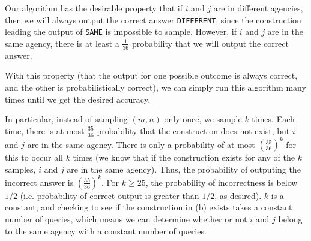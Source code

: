 \documentclass{6046}
\begin{document}
Our algorithm has the desirable property
that if $i$ and $j$ are in different agencies,
then we will always output the correct answer
{\tt DIFFERENT}, since the construction leading
the output of {\tt SAME} is impossible to sample.
However, if $i$ and $j$ are in the same agency,
there is at least a $\frac{1}{36}$ probability
that we will output the correct answer.

With this property (that the output for
one possible outcome is always correct, and the
other is probabilistically correct), we
can simply run this algorithm many times until
we get the desired accuracy.

In particular, instead of sampling
$(m, n)$ only once, we sample $k$ times.
Each time, there is at most $\frac{35}{36}$
probability that the construction does not
exist, but $i$ and $j$ are in the same agency.
There is only a probability of at most
$(\frac{35}{36})^k$ for this to occur all
$k$ times (we know that if the construction
exists for any of the $k$ samples, $i$ and $j$
are in the same agency). Thus, the probability
of outputing the incorrect answer is
$(\frac{35}{36})^k$. For $k \ge 25$,
the probability of incorrectness is below
$1/2$ (i.e. probability of correct output
is greater than $1/2$, as desired). $k$ is
a constant, and checking to see if the
construction in (b) exists takes a constant
number of queries, which means
we can determine whether or not $i$ and $j$
belong to the same agency with a constant
number of queries.
\end{document}
